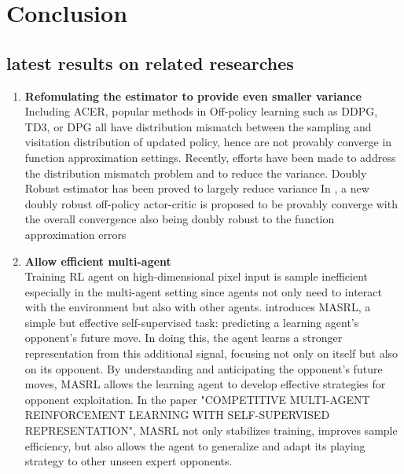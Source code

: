 \section{Conclusion}
\label{section:conclusion}


\subsection{latest results on related researches}
\begin{enumerate}
    \item \textbf{Refomulating the estimator to provide even smaller variance}\\
    Including ACER, popular methods in Off-policy learning such as DDPG, TD3, or DPG all have 
    distribution mismatch between the sampling and visitation distribution of updated policy, hence
    are not provably converge in function approximation settings.
    Recently, efforts have been made to address the distribution mismatch problem and to reduce the variance. 
    Doubly Robust estimator has been proved to largely reduce variance
    In \cite{xu2021doubly}, a new doubly robust off-policy actor-critic is proposed to be provably converge 
    with the overall convergence also being doubly robust to the function approximation errors

    \item \textbf{Allow efficient multi-agent}\\
    Training RL agent on high-dimensional pixel input is sample inefficient especially in the multi-agent setting since agents not only need to interact with the environment but also with other agents. 
    \cite{9747378} introduces MASRL, a simple but effective self-supervised task: predicting a learning agent’s opponent’s future move. 
    In doing this, the agent learns a stronger representation from this additional signal, focusing not only on itself but also on its opponent.
    By understanding and anticipating the opponent’s future moves, MASRL allows the learning agent to develop effective strategies for opponent exploitation.
    In the paper "COMPETITIVE MULTI-AGENT REINFORCEMENT LEARNING WITH SELF-SUPERVISED REPRESENTATION", MASRL not only stabilizes training, improves sample efficiency, but also allows the agent
    to generalize and adapt its playing strategy to other unseen expert opponents.


\end{enumerate}
